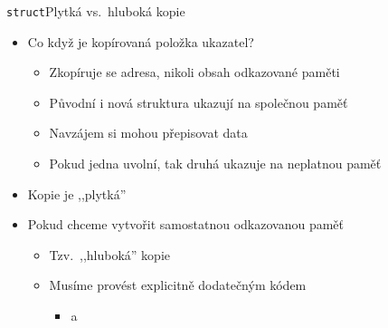 %
%

\begin{frame}{\texttt{struct}}{Plytká vs.\ hluboká kopie}

  \begin{itemize}
    \item Co když je kopírovaná položka ukazatel?
    \begin{itemize}
      \item Zkopíruje se adresa, nikoli obsah odkazované paměti

      \pause

      \item Původní i nová struktura ukazují na společnou paměť
      \item Navzájem si mohou přepisovat data
      \item Pokud jedna uvolní, tak druhá ukazuje na neplatnou paměť
    \end{itemize}

    \pause

    \item Kopie je ,,plytká''

    \pause

    \item Pokud chceme vytvořit samostatnou odkazovanou paměť
    \begin{itemize}
      \item Tzv.\ ,,hluboká'' kopie

      \pause

      \item Musíme provést explicitně dodatečným kódem
      \begin{itemize}
	\item {} a 
      \end{itemize}
    \end{itemize}

  \end{itemize}

\end{frame}

